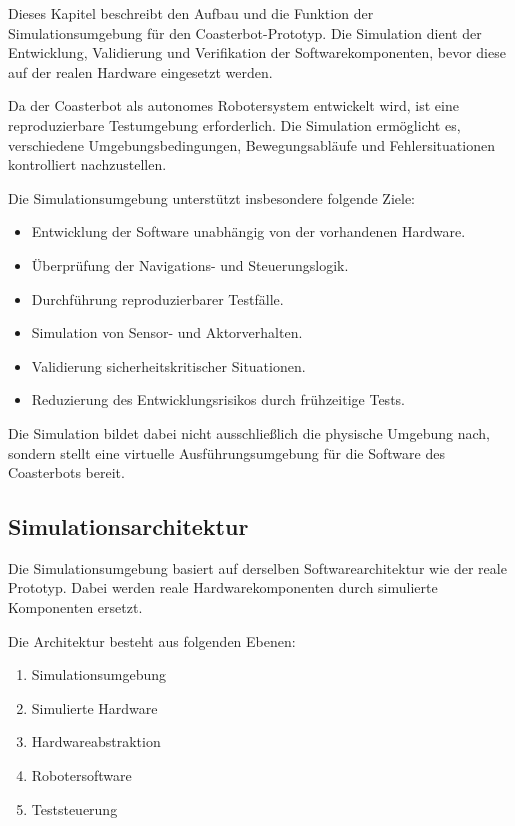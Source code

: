 \documentclass[
  a4paper,
  12pt,
  DIV=12,        %
  parskip=half,  %
  headings=small %
]{scrartcl}
\theoremstyle{definition}
\providecommand{\tightlist}{%
  \setlength{\itemsep}{0pt}\setlength{\parskip}{0pt}}
\theoremstyle{definition}
\begin{document}
Dieses Kapitel beschreibt den Aufbau und die Funktion der
Simulationsumgebung für den Coasterbot-Prototyp. Die Simulation dient
der Entwicklung, Validierung und Verifikation der Softwarekomponenten,
bevor diese auf der realen Hardware eingesetzt werden.

Da der Coasterbot als autonomes Robotersystem entwickelt wird, ist eine
reproduzierbare Testumgebung erforderlich. Die Simulation ermöglicht es,
verschiedene Umgebungsbedingungen, Bewegungsabläufe und
Fehlersituationen kontrolliert nachzustellen.

Die Simulationsumgebung unterstützt insbesondere folgende Ziele:

\begin{itemize}
\tightlist
\item
  Entwicklung der Software unabhängig von der vorhandenen Hardware.
\item
  Überprüfung der Navigations- und Steuerungslogik.
\item
  Durchführung reproduzierbarer Testfälle.
\item
  Simulation von Sensor- und Aktorverhalten.
\item
  Validierung sicherheitskritischer Situationen.
\item
  Reduzierung des Entwicklungsrisikos durch frühzeitige Tests.
\end{itemize}

Die Simulation bildet dabei nicht ausschließlich die physische Umgebung
nach, sondern stellt eine virtuelle Ausführungsumgebung für die Software
des Coasterbots bereit.

\subsection{Simulationsarchitektur}\label{simulationsarchitektur-1}

Die Simulationsumgebung basiert auf derselben Softwarearchitektur wie
der reale Prototyp. Dabei werden reale Hardwarekomponenten durch
simulierte Komponenten ersetzt.

Die Architektur besteht aus folgenden Ebenen:

\begin{enumerate}
\def\labelenumi{\arabic{enumi}.}
\tightlist
\item
  Simulationsumgebung
\item
  Simulierte Hardware
\item
  Hardwareabstraktion
\item
  Robotersoftware
\item
  Teststeuerung
\end{enumerate}
\end{document}
